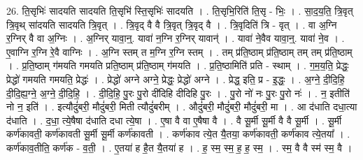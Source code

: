 \documentclass[17pt]{extarticle}
\begin{document}
26. ति॒सृभिः॑ सादयति सादयति ति॒सृभि॑ स्ति॒सृभिः॑ सादयति । . ति॒सृभि॒रिति॑ ति॒सृ - भिः॒ । . सा॒द॒य॒ति॒ त्रि॒वृत् त्रि॒वृथ् सा॑दयति सादयति त्रि॒वृत् । . त्रि॒वृद् वै वै त्रि॒वृत् त्रि॒वृद् वै । . त्रि॒वृदिति॑ त्रि - वृत् । . वा अ॒ग्नि र॒ग्निर् वै वा अ॒ग्निः । . अ॒ग्निर् यावा॒न्॒. यावा॑ न॒ग्नि र॒ग्निर् यावान्॑ । . यावा॑ ने॒वैव यावा॒न्॒. यावा॑ ने॒व । . ए॒वाग्नि र॒ग्नि रे॒वै वाग्निः । . अ॒ग्नि स्तम् त म॒ग्नि र॒ग्नि स्तम् । . तम् प्र॑ति॒ष्ठाम् प्र॑ति॒ष्ठाम् तम् तम् प्र॑ति॒ष्ठाम् । . प्र॒ति॒ष्ठाम् ग॑मयति गमयति प्रति॒ष्ठाम् प्र॑ति॒ष्ठाम् ग॑मयति । . प्र॒ति॒ष्ठामिति॑ प्रति - स्थाम् । . ग॒म॒य॒ति॒ प्रेद्धः॒ प्रेद्धो॑ गमयति गमयति॒ प्रेद्धः॑ । . प्रेद्धो॑ अग्ने अग्ने॒ प्रेद्धः॒ प्रेद्धो॑ अग्ने । . प्रेद्ध॒ इति॒ प्र - इ॒द्धः॒ । . अ॒ग्ने॒ दी॒दि॒हि॒ दी॒दि॒ह्य॒ग्ने॒ अ॒ग्ने॒ दी॒दि॒हि॒ । . दी॒दि॒हि॒ पु॒रः पु॒रो दी॑दिहि दीदिहि पु॒रः । . पु॒रो नो॑ नः पु॒रः पु॒रो नः॑ । . न॒ इतीति॑ नो न॒ इति॑ । . इत्यौदुं॑बरी॒ मौदुं॑बरी॒ मिती त्यौदुं॑बरीम् । . औदुं॑बरी॒ मौदुं॑बरी॒ मौदुं॑बरी॒ मा । . आ द॑धाति दधा॒त्या द॑धाति । . द॒धा॒ त्ये॒षैषा द॑धाति दधा त्ये॒षा । . ए॒षा वै वा ए॒षैषा वै । . वै सू॒र्मी सू॒र्मी वै वै सू॒र्मी । . सू॒र्मी कर्ण॑कावती॒ कर्ण॑कावती सू॒र्मी सू॒र्मी कर्ण॑कावती । . कर्ण॑काव त्ये॒त यै॒तया॒ कर्ण॑कावती॒ कर्ण॑काव त्ये॒तया᳚ । . कर्ण॑काव॒तीति॒ कर्ण॑क - व॒ती॒ । . ए॒तया॑ ह है॒त यै॒तया॑ ह । . ह॒ स्म॒ स्म॒ ह॒ ह॒ स्म॒ । . स्म॒ वै वै स्म॑ स्म॒ वै । \newline
\end{document}
